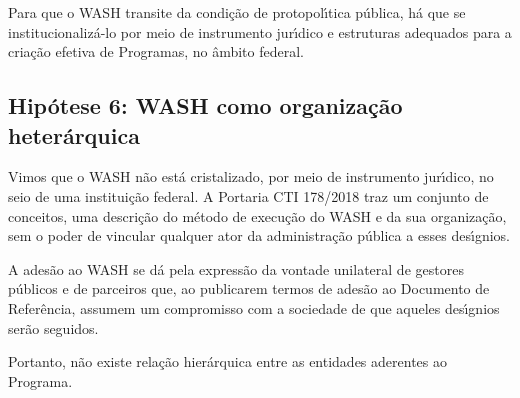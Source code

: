 \documentclass[
12pt,		%
openright,	%
twoside,  %
a4paper,			%
chapter=TITLE,		%
english,			%
french,				%
spanish,			%
brazil				%
]{USPSC-classe/USPSC}
\begin{document}
Para que o WASH transite da condi\c{c}\~ao de protopol\'{\i}tica p\'ublica, h\'a que se institucionaliz\'a-lo por meio de instrumento jur\'{\i}dico e estruturas  adequados para a cria\c{c}\~ao efetiva de Programas, no \^ambito federal.

















\subsection[Hip\'otese 6: WASH como organiza\c{c}\~ao heter\'arquica]{Hip\'otese 6: WASH como organiza\c{c}\~ao heter\'arquica}\label{Hip\'otese 6: WASH como organiza\c{c}\~ao heter\'arquica}
Vimos que o WASH n\~ao est\'a cristalizado, por meio de instrumento jur\'{\i}dico, no seio de uma institui\c{c}\~ao federal. A Portaria CTI 178/2018 traz um conjunto de conceitos, uma descri\c{c}\~ao do m\'etodo de execu\c{c}\~ao do WASH e da sua organiza\c{c}\~ao, sem o poder de vincular qualquer ator da administra\c{c}\~ao p\'ublica a esses des\'{\i}gnios.

















A ades\~ao ao WASH se d\'a pela express\~ao da vontade unilateral de gestores p\'ublicos e de parceiros que, ao publicarem termos de ades\~ao ao Documento de Refer\^encia, assumem um compromisso com a sociedade de que aqueles des\'{\i}gnios ser\~ao seguidos.

















Portanto, n\~ao existe rela\c{c}\~ao hier\'arquica entre as entidades aderentes ao \textquotedbl Programa\textquotedbl .
\end{document}
